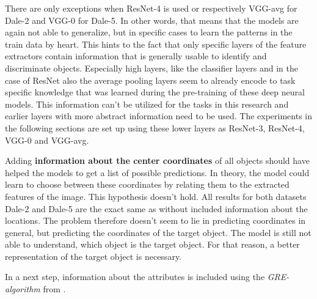 There are only exceptions when ResNet-4 is used or respectively VGG-avg for Dale-2 and VGG-0 for Dale-5.
In other words, that means that the models are again not able to generalize, but in specific cases to learn the patterns in the train data by heart.
This hints to the fact that only specific layers of the feature extractors contain information that is generally usable to identify and discriminate objects.
Especially high layers, like the classifier layers and in the case of ResNet also the average pooling layers seem to already encode to task specific knowledge that was learned during the pre-training of these deep neural models.
This information can't be utilized for the tasks in this research and earlier layers with more abstract information need to be used.
The experiments in the following sections are set up using these lower layers as ResNet-3, ResNet-4, VGG-0 and VGG-avg.

Adding \textbf{information about the center coordinates} of all objects should have helped the models to get a list of possible predictions.
In theory, the model could learn to choose between these coordinates by relating them to the extracted features of the image.
This hypothesis doesn't hold.
All results for both datasets Dale-2 and Dale-5 are the exact same as without included information about the locations.
The problem therefore doesn't seem to lie in predicting coordinates in general, but predicting the coordinates of the target object.
The model is still not able to understand, which object is the target object.
For that reason, a better representation of the target object is necessary.

In a next step, information about the attributes is included using the \emph{GRE-algorithm} from \citet{Dale1995}.

